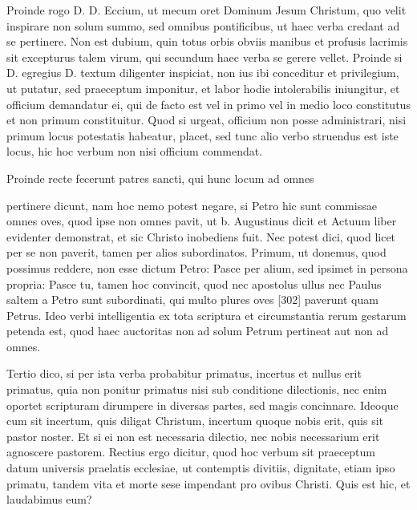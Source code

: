 Proinde rogo D. D. Eccium, ut mecum oret Dominum Jesum Christum, quo velit inspirare non solum summo, sed omnibus pontificibus, ut haec verba credant ad se pertinere. Non est dubium, quin totus orbis obviis manibus et profusis lacrimis sit excepturus talem virum, qui secundum haec verba se gerere vellet. Proinde si D. egregius D. textum diligenter inspiciat, non ius ibi conceditur et privilegium, ut putatur, sed praeceptum imponitur, et labor hodie intolerabilis iniungitur, et officium demandatur ei, qui de facto est vel in primo vel in medio loco constitutus et non primum constituitur. Quod si urgeat, officium non posse administrari, nisi primum locus potestatis habeatur, placet, sed tunc alio verbo struendus est iste locus, hic hoc verbum non nisi officium commendat.

Proinde recte fecerunt patres sancti, qui hunc locum ad omnes

pertinere dicunt, nam hoc nemo potest negare, si Petro hic sunt commissae omnes oves, quod ipse non omnes pavit, ut b. Augustinus dicit et Actuum liber evidenter demonstrat, et sic Christo inobediens fuit. Nec potest dici, quod licet per se non paverit, tamen per alios subordinatos. Primum, ut donemus, quod possimus reddere, non esse dictum Petro: Pasce per alium, sed ipsimet in persona propria: Pasce tu, tamen hoc convincit, quod nec apostolus ullus nec Paulus saltem a Petro sunt subordinati, qui multo plures oves [302] paverunt quam Petrus. Ideo verbi intelligentia ex tota scriptura et circumstantia rerum gestarum petenda est, quod haec auctoritas non ad solum Petrum pertineat aut non ad omnes.

Tertio dico, si per ista verba probabitur primatus, incertus et nullus erit primatus, quia non ponitur primatus nisi sub conditione dilectionis, nec enim oportet scripturam dirumpere in diversas partes, sed magis concinnare. Ideoque cum sit incertum, quis diligat Christum, incertum quoque nobis erit, quis sit pastor noster. Et si ei non est necessaria dilectio, nec nobis necessarium erit agnoscere pastorem. Rectius ergo dicitur, quod hoc verbum sit praeceptum datum universis praelatis ecclesiae, ut contemptis divitiis, dignitate, etiam ipso primatu, tandem vita et morte sese impendant pro ovibus Christi. Quis est hic, et laudabimus eum?

